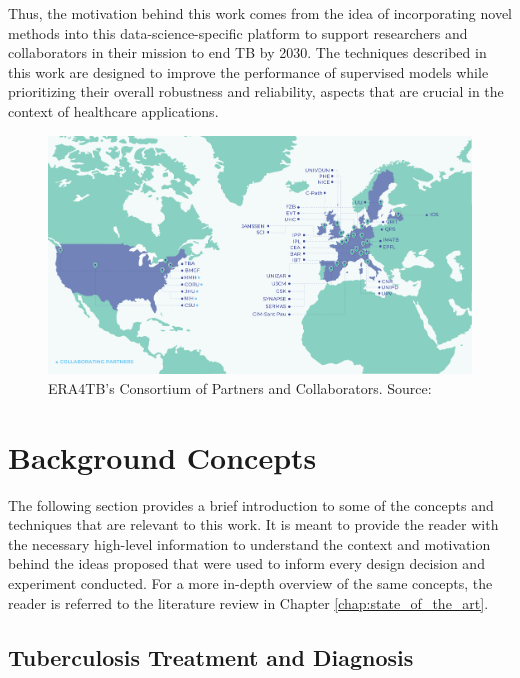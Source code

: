 \documentclass[../main.tex]{subfiles}
\begin{document}
    Thus, the motivation behind this work comes from the idea of incorporating novel methods into this data-science-specific platform to support researchers and collaborators in their mission to end TB by 2030. The techniques described in this work are designed to improve the performance of supervised models while prioritizing their overall robustness and reliability, aspects that are crucial in the context of healthcare applications.

    \begin{figure}[H]
        \centering
        \includegraphics[width=\textwidth]{figures/ERA4TB_map.png}
        \caption{ERA4TB's Consortium of Partners and Collaborators. Source: \cite{noauthor_era4tb}}
        \label{fig:era4tb}
    \end{figure}

    \section{Background Concepts} \label{sec:background}
    
    The following section provides a brief introduction to some of the concepts and techniques that are relevant to this work. It is meant to provide the reader with the necessary high-level information to understand the context and motivation behind the ideas proposed that were used to inform every design decision and experiment conducted. For a more in-depth overview of the same concepts, the reader is referred to the literature review in Chapter \ref{chap:state_of_the_art}.

    \subsection{Tuberculosis Treatment and Diagnosis} \label{sec:tuberculosis_data}
\end{document}
